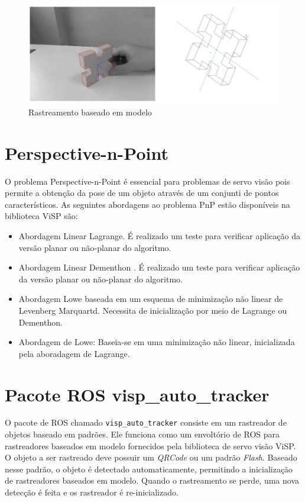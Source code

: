 \begin{figure}[!ht]
\centering
  \includegraphics[width=\linewidth]{./img/visp.png}
  \caption{Rastreamento baseado em modelo}
  \label{fig:cenpes_doris}
\end{figure}%

\section{Perspective-n-Point}
O problema Perspective-n-Point é essencial para problemas de servo visão pois permite a obtenção da pose de um objeto através de um conjunti de pontos característicos.  As seguintes abordagens ao problema PnP estão disponíveis na biblioteca ViSP são:
\begin{itemize}
\item Abordagem Linear Lagrange. É realizado um teste para verificar aplicação da versão planar ou não-planar do algoritmo. 

\item Abordagem Linear Dementhon \citep{dementhon1995model, oberkampf1996iterative}.  É realizado um teste para verificar aplicação da versão planar ou não-planar do algoritmo. 
	
\item Abordagem Lowe baseada em um esquema de minimização não linear de Levenberg Marquartd. Necessita de inicialização por meio de Lagrange ou Dementhon.

\item  Abordagem de Lowe: Baseia-se em uma minimização não linear, inicializada pela aboradagem de Lagrange.
\end{itemize}

\section{Pacote ROS visp\_auto\_tracker}
O pacote de ROS chamado \verb|visp_auto_tracker| consiste em um rastreador de objetos baseado em padrões. Ele funciona como um envoltório de ROS para rastreadores baseados em modelo fornecidos pela biblioteca de servo visão ViSP. O objeto a ser rastreado deve possuir um \textit{QRCode} ou um padrão \textit{Flash}. Baseado nesse padrão, o objeto é detectado automaticamente, permitindo a inicialização de rastreadores baseados em modelo. Quando o rastreamento se perde, uma nova detecção é feita e os rastreador é re-inicializado.

